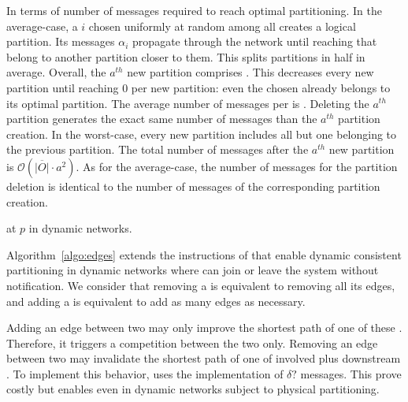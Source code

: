  In terms of number of messages
required to reach optimal partitioning. In the average-case, a
\process $i$ chosen uniformly at random among all \processes creates a
logical partition. Its messages $\alpha_i$ propagate through the
network until reaching \processes that belong to another partition
closer to them. This splits partitions in half in average. Overall,
the $a^{th}$ new partition comprises
\processes. This decreases every new partition until reaching $0$
\processes per new partition: even the chosen \process already belongs
to its optimal partition. The average number of messages per \process
is .  Deleting the
$a^{th}$ partition generates the exact same number of messages than
the $a^{th}$ partition creation.  In the
worst-case, every new partition includes all but one \process
belonging to the previous partition. The total number of messages
after the $a^{th}$ new partition is $\mathcal{O}(\overline{|O|}\cdot
a^2)$. As for the average-case, the number of messages for the
partition deletion is identical to the number of messages of the
corresponding partition creation.
\noindent {}

\begin{algorithm}
  
  \caption{\label{algo:edges}\NAME at \Process $p$ in dynamic networks.}
\end{algorithm}

Algorithm~\ref{algo:edges} extends the instructions of \NAME that
enable dynamic consistent partitioning in dynamic networks where
\processes can join or leave the system without notification. We
consider that removing a \process is equivalent to removing all its
edges, and adding a \process is equivalent to add as many edges as
necessary.

Adding an edge between two \processes may only improve the shortest
path of one of these \processes. Therefore, it triggers a competition
between the two \processes only. Removing an edge between two
\processes may invalidate the shortest path of one of involved
\processes plus downstream \processes. To implement this behavior,
\NAME uses the implementation of $\delta?$ messages. This prove costly
but enables \NAME even in dynamic networks subject to physical
partitioning.


